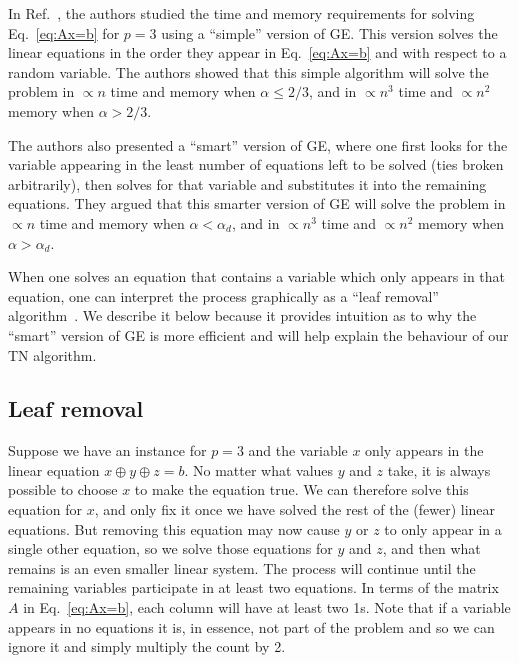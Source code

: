 In Ref.~\cite{braunstein_complexity_2002}, the authors studied the time and memory requirements for solving Eq.~\ref{eq:Ax=b} for $p = 3$ using a ``simple'' version of GE.
This version solves the linear equations in the order they appear in Eq.~\ref{eq:Ax=b} and with respect to a random variable.
The authors showed that this simple algorithm will solve the problem in $\propto n$ time and memory when $\alpha \leq 2/3$, and in $\propto n^3$ time and $\propto n^2$ memory when $\alpha > 2/3$.

The authors also presented a ``smart'' version of GE, where one first looks for the variable appearing in the least number of equations left to be solved (ties broken arbitrarily), then solves for that variable and substitutes it into the remaining equations.
They argued that this smarter version of GE will solve the problem in $\propto n$ time and memory when $\alpha < \alpha_d$, and in $\propto n^3$ time and $\propto n^2$ memory when $\alpha > \alpha_d$.

When one solves an equation that contains a variable which only appears in that equation, one can interpret the process graphically as a ``leaf removal'' algorithm~\cite{mezard_alternative_2002}.
We describe it below because it provides intuition as to why the ``smart'' version of GE is more efficient and will help explain the behaviour of our TN algorithm.

\subsection{Leaf removal}\label{sec:leaf-removal-algorithm}

Suppose we have an instance for $p=3$ and the variable $x$ only appears in the linear equation $x \oplus y \oplus z = b$.
No matter what values $y$ and $z$ take, it is always possible to choose $x$ to make the equation true.
We can therefore solve this equation for $x$, and only fix it once we have solved the rest of the (fewer) linear equations.
But removing this equation may now cause $y$ or $z$ to only appear in a single other equation, so we solve those equations for $y$ and $z$, and then what remains is an even smaller linear system.
The process will continue until the remaining variables participate in at least two equations.
In terms of the matrix $A$ in Eq.~\ref{eq:Ax=b}, each column will have at least two 1s.
Note that if a variable appears in no equations it is, in essence, not part of the problem and so we can ignore it and simply multiply the count by 2.

